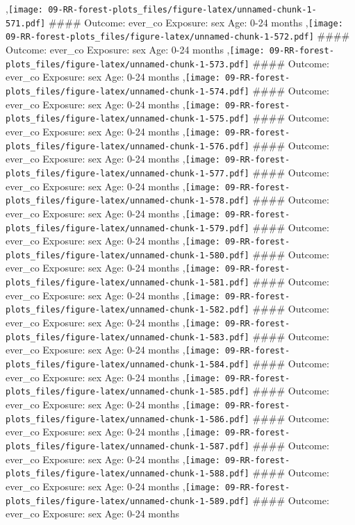 \documentclass[
  9pt,
]{book}
\begin{document}
,\texttt{[image: 09-RR-forest-plots\_files/figure-latex/unnamed-chunk-1-571.pdf]}
\#\#\#\# Outcome: ever\_co Exposure: sex Age: 0-24 months
,\texttt{[image: 09-RR-forest-plots\_files/figure-latex/unnamed-chunk-1-572.pdf]}
\#\#\#\# Outcome: ever\_co Exposure: sex Age: 0-24 months
,\texttt{[image: 09-RR-forest-plots\_files/figure-latex/unnamed-chunk-1-573.pdf]}
\#\#\#\# Outcome: ever\_co Exposure: sex Age: 0-24 months
,\texttt{[image: 09-RR-forest-plots\_files/figure-latex/unnamed-chunk-1-574.pdf]}
\#\#\#\# Outcome: ever\_co Exposure: sex Age: 0-24 months
,\texttt{[image: 09-RR-forest-plots\_files/figure-latex/unnamed-chunk-1-575.pdf]}
\#\#\#\# Outcome: ever\_co Exposure: sex Age: 0-24 months
,\texttt{[image: 09-RR-forest-plots\_files/figure-latex/unnamed-chunk-1-576.pdf]}
\#\#\#\# Outcome: ever\_co Exposure: sex Age: 0-24 months
,\texttt{[image: 09-RR-forest-plots\_files/figure-latex/unnamed-chunk-1-577.pdf]}
\#\#\#\# Outcome: ever\_co Exposure: sex Age: 0-24 months
,\texttt{[image: 09-RR-forest-plots\_files/figure-latex/unnamed-chunk-1-578.pdf]}
\#\#\#\# Outcome: ever\_co Exposure: sex Age: 0-24 months
,\texttt{[image: 09-RR-forest-plots\_files/figure-latex/unnamed-chunk-1-579.pdf]}
\#\#\#\# Outcome: ever\_co Exposure: sex Age: 0-24 months
,\texttt{[image: 09-RR-forest-plots\_files/figure-latex/unnamed-chunk-1-580.pdf]}
\#\#\#\# Outcome: ever\_co Exposure: sex Age: 0-24 months
,\texttt{[image: 09-RR-forest-plots\_files/figure-latex/unnamed-chunk-1-581.pdf]}
\#\#\#\# Outcome: ever\_co Exposure: sex Age: 0-24 months
,\texttt{[image: 09-RR-forest-plots\_files/figure-latex/unnamed-chunk-1-582.pdf]}
\#\#\#\# Outcome: ever\_co Exposure: sex Age: 0-24 months
,\texttt{[image: 09-RR-forest-plots\_files/figure-latex/unnamed-chunk-1-583.pdf]}
\#\#\#\# Outcome: ever\_co Exposure: sex Age: 0-24 months
,\texttt{[image: 09-RR-forest-plots\_files/figure-latex/unnamed-chunk-1-584.pdf]}
\#\#\#\# Outcome: ever\_co Exposure: sex Age: 0-24 months
,\texttt{[image: 09-RR-forest-plots\_files/figure-latex/unnamed-chunk-1-585.pdf]}
\#\#\#\# Outcome: ever\_co Exposure: sex Age: 0-24 months
,\texttt{[image: 09-RR-forest-plots\_files/figure-latex/unnamed-chunk-1-586.pdf]}
\#\#\#\# Outcome: ever\_co Exposure: sex Age: 0-24 months
,\texttt{[image: 09-RR-forest-plots\_files/figure-latex/unnamed-chunk-1-587.pdf]}
\#\#\#\# Outcome: ever\_co Exposure: sex Age: 0-24 months
,\texttt{[image: 09-RR-forest-plots\_files/figure-latex/unnamed-chunk-1-588.pdf]}
\#\#\#\# Outcome: ever\_co Exposure: sex Age: 0-24 months
,\texttt{[image: 09-RR-forest-plots\_files/figure-latex/unnamed-chunk-1-589.pdf]}
\#\#\#\# Outcome: ever\_co Exposure: sex Age: 0-24 months
\end{document}
